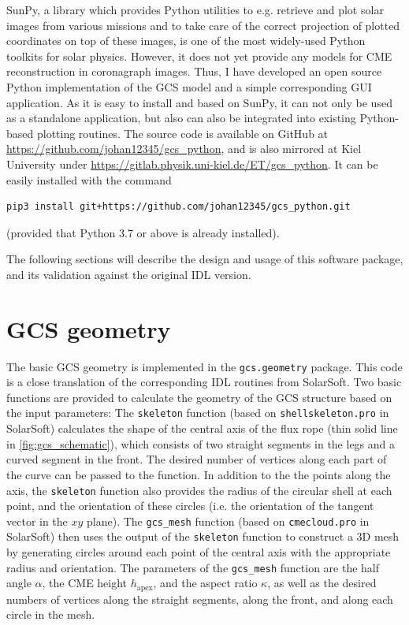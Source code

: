SunPy, a library \citep{sunpy_community2020} which provides Python utilities to e.g. retrieve and plot solar images from various missions and to take care of the correct projection of plotted coordinates on top of these images, is one of the most widely-used Python toolkits for solar physics. However, it does not yet provide any models for CME reconstruction in coronagraph images.
Thus, I have developed an open source Python implementation of the GCS model and a simple corresponding GUI application. As it is easy to install and based on SunPy, it can not only be used as a standalone application, but also can also be integrated into existing Python-based plotting routines. The source code is available on GitHub at \url{https://github.com/johan12345/gcs_python}, and is also mirrored at Kiel University under \url{https://gitlab.physik.uni-kiel.de/ET/gcs_python}. It can be easily installed with the command
\begin{verbatim}
pip3 install git+https://github.com/johan12345/gcs_python.git
\end{verbatim}
(provided that Python 3.7 or above is already installed).

The following sections will describe the design and usage of this software package, and its validation against the original IDL version.

\section{GCS geometry}

The basic GCS geometry is implemented in the \texttt{gcs.geometry} package. This code is a close translation of the corresponding IDL routines from SolarSoft. Two basic functions are provided to calculate the geometry of the GCS structure based on the input parameters: The \texttt{skeleton} function (based on \texttt{shellskeleton.pro} in SolarSoft) calculates the shape of the central axis of the flux rope (thin solid line in \autoref{fig:gcs_schematic}), which consists of two straight segments in the legs and a curved segment in the front. The desired number of vertices along each part of the curve can be passed to the function.
In addition to the the points along the axis, the \texttt{skeleton} function also provides the radius of the circular shell at each point, and the orientation of these circles (i.e. the orientation of the tangent vector in the $xy$ plane).
The \verb|gcs_mesh| function (based on \texttt{cmecloud.pro} in SolarSoft) then uses the output of the \texttt{skeleton} function to construct a 3D mesh by generating circles around each point of the central axis with the appropriate radius and orientation. The parameters of the \verb|gcs_mesh| function are the half angle $\alpha$, the CME height $h_\text{apex}$, and the aspect ratio $\kappa$, as well as the desired numbers of vertices along the straight segments, along the front, and along each circle in the mesh.

